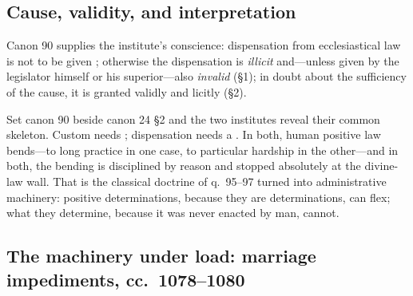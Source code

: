 \subsection{Cause, validity, and interpretation}

Canon 90 supplies the institute's conscience: dispensation from ecclesiastical law is not to be given ; otherwise the dispensation is \emph{illicit} and---unless given by the legislator himself or his superior---also \emph{invalid} (§1); in doubt about the sufficiency of the cause, it is granted validly and licitly (§2).

Set canon 90 beside canon 24 §2 and the two institutes reveal their common skeleton. Custom needs ; dispensation needs a . In both, human positive law bends---to long practice in one case, to particular hardship in the other---and in both, the bending is disciplined by reason and stopped absolutely at the divine-law wall. That is the classical doctrine of q.~95--97 turned into administrative machinery: positive determinations, because they are determinations, can flex; what they determine, because it was never enacted by man, cannot.

\subsection{The machinery under load: marriage impediments, cc.~1078--1080}

